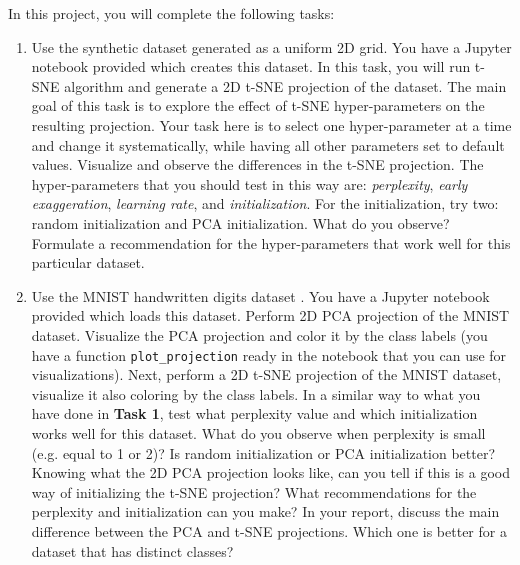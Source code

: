 \documentclass[11pt]{article}
\begin{document}
In this project, you will complete the following tasks:

\begin{enumerate}[start=1,label={\bfseries Task \arabic*:}]
\item Use the synthetic dataset generated as a uniform 2D grid. You have a Jupyter notebook provided which creates this dataset. In this task, you will run t-SNE algorithm and generate a 2D t-SNE projection of the dataset. The main goal of this task is to explore the effect of t-SNE hyper-parameters on the resulting projection. Your task here is to select one hyper-parameter at a time and change it systematically, while having all other parameters set to default values. Visualize and observe the differences in the t-SNE projection. The hyper-parameters that you should test in this way are: \textit{perplexity}, \textit{early exaggeration}, \textit{learning rate}, and \textit{initialization}. For the initialization, try two: random initialization and PCA initialization. What do you observe? Formulate a recommendation for the hyper-parameters that work well for this particular dataset.
\item Use the MNIST handwritten digits dataset \cite{deng2012mnist}. You have a Jupyter notebook provided which loads this dataset. Perform 2D PCA projection of the MNIST dataset. Visualize the PCA projection and color it by the class labels (you have a function \textcolor{code-pink}{\texttt{plot\_projection}} ready in the notebook that you can use for visualizations). Next, perform a 2D t-SNE projection of the MNIST dataset, visualize it also coloring by the class labels. In a similar way to what you have done in \textbf{Task 1}, test what perplexity value and which initialization works well for this dataset. What do you observe when perplexity is small (e.g. equal to 1 or 2)? Is random initialization or PCA initialization better? Knowing what the 2D PCA projection looks like, can you tell if this is a good way of initializing the t-SNE projection? What recommendations for the perplexity and initialization can you make? In your report, discuss the main difference between the PCA and t-SNE projections. Which one is better for a dataset that has distinct classes?

\end{enumerate}
\end{document}
